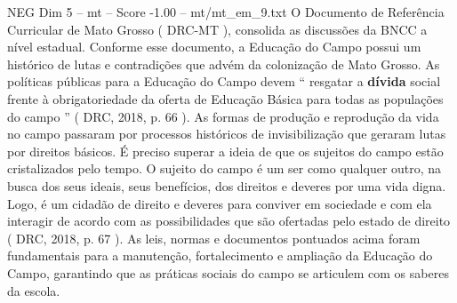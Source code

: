 \begin{textsample}{NEG Dim 5 – mt – Score -1.00 – mt/mt\_em\_9.txt}
O Documento de Referência Curricular de Mato Grosso ( DRC-MT ), consolida as discussões da BNCC a nível estadual.
Conforme esse documento, a Educação do Campo possui um histórico de lutas e contradições que advém da colonização de Mato Grosso.
As políticas públicas para a Educação do Campo devem “ resgatar a \textbf{dívida} social frente à obrigatoriedade da oferta de Educação Básica para todas as populações do campo ” ( DRC, 2018, p. 66 ).
As formas de produção e reprodução da vida no campo passaram por processos históricos de invisibilização que geraram lutas por direitos básicos.
É preciso superar a ideia de que os sujeitos do campo estão cristalizados pelo tempo.
O sujeito do campo é um ser como qualquer outro, na busca dos seus ideais, seus benefícios, dos direitos e deveres por uma vida digna.
Logo, é um cidadão de direito e deveres para conviver em sociedade e com ela interagir de acordo com as possibilidades que são ofertadas pelo estado de direito ( DRC, 2018, p. 67 ).
As leis, normas e documentos pontuados acima foram fundamentais para a manutenção, fortalecimento e ampliação da Educação do Campo, garantindo que as práticas sociais do campo se articulem com os saberes da escola.

\end{textsample}
